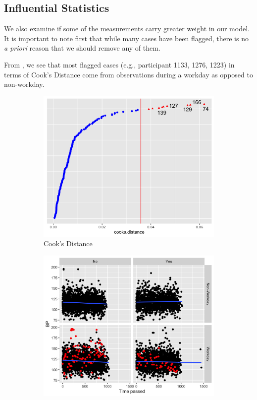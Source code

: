 \documentclass[12pt,twoside,letterpaper]{article}
\theoremstyle{definition}
\theoremstyle{definition}
\begin{document}
\subsection{Influential Statistics}\label{sec: infl stat}

We also examine if some of the measurements carry greater weight in our model. It is important to note first that while many cases have been flagged, there is no \emph{a priori} reason that we should remove any of them.

From , we see that most flagged cases (e.g., participant 1133, 1276, 1223) in terms of Cook's Distance come from observations during a workday as opposed to non-workday. 
\begin{figure}[H] 
    \centering
    \begin{subfigure}[b]{0.38\textwidth}
    \centering
    \includegraphics[width=\textwidth]{pics/cook dist.png}
    \caption[]%
    {{\small Cook's Distance}}
    \label{fig: cook dist}
    \end{subfigure}
    \begin{subfigure}[b]{0.38\textwidth}
    \centering
    \includegraphics[width=\textwidth]{pics/cook by time and bp.png}

\end{subfigure}
\end{figure}
\end{document}
